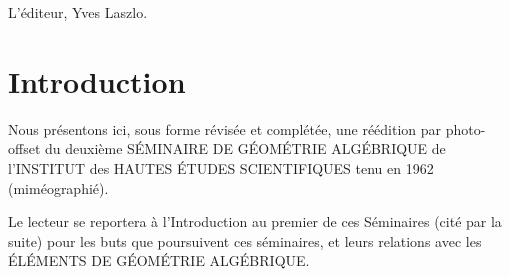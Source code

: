 \bigskip
\begin{flushright}
L'\'editeur, Yves Laszlo.
\end{flushright}

{\def\ndemark{}\def\sfootnotemark{}\let\\ \relax {}\tableofcontents}

\mainmatter
\chapter*{Introduction} \label{I.0}

Nous pr\'esentons ici, sous forme r\'evis\'ee et compl\'et\'ee, une r\'e\'edition par photo-offset du deuxi\`eme S\'EMINAIRE DE G\'{E}OM\'{E}TRIE ALG\'EBRIQUE de l'INSTITUT des HAUTES \'ETUDES SCIENTIFIQUES tenu en 1962 (mim\'eographi\'e).

Le lecteur se reportera \`a l'Introduction au premier de ces S\'eminaires (cit\'e  par la suite) pour les buts que poursuivent ces s\'eminaires, et leurs relations avec les \'EL\'EMENTS DE G\'{E}OM\'{E}TRIE ALG\'EBRIQUE.

